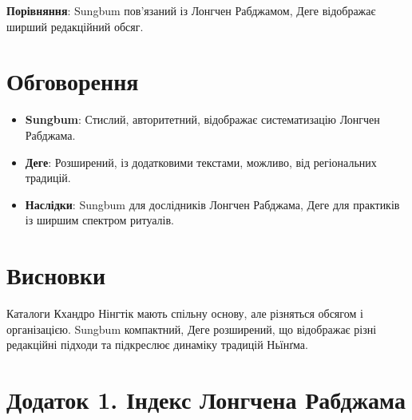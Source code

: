 \documentclass{article}
\begin{document}
\textbf{Порівняння}: Sungbum пов’язаний із Лонгчен Рабджамом, Деге відображає ширший редакційний обсяг.

\section{Обговорення}
\begin{itemize}
    \item \textbf{Sungbum}: Стислий, авторитетний, відображає систематизацію Лонгчен Рабджама.
    \item \textbf{Деге}: Розширений, із додатковими текстами, можливо, від регіональних традицій.
    \item \textbf{Наслідки}: Sungbum для дослідників Лонгчен Рабджама, Деге для практиків із ширшим спектром ритуалів.
\end{itemize}

\section{Висновки}
Каталоги Кхандро Нінгтік мають спільну основу, але різняться обсягом і організацією. Sungbum компактний, Деге розширений, що відображає різні редакційні підходи та підкреслює динаміку традицій Ньїнґма.

\newpage
\section{Додаток 1. Індекс Лонгчена Рабджама}
\end{document}
